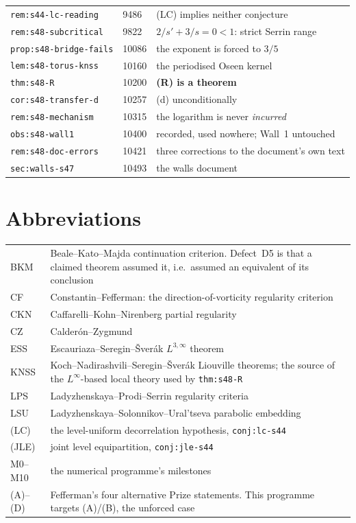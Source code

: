 {\begin{longtable}{@{}>{\raggedright\arraybackslash}p{} l >{\raggedright\arraybackslash}p{}@{}}
\texttt{rem:s44-lc-reading} & 9486 & (LC) implies neither conjecture \\
\texttt{rem:s48-subcritical} & 9822 & \(2/s'+3/s=0<1\): strict Serrin range \\
\texttt{prop:s48-bridge-fails} & 10086 & the exponent is forced to \(3/5\) \\
\texttt{lem:s48-torus-knss} & 10160 & the periodised Oseen kernel \\
\texttt{thm:s48-R} & 10200 & \textbf{(R) is a theorem} \\
\texttt{cor:s48-transfer-d} & 10257 & (d) unconditionally \\
\texttt{rem:s48-mechanism} & 10315 & the logarithm is never \emph{incurred} \\
\texttt{obs:s48-wall1} & 10400 & recorded, used nowhere; Wall~1 untouched \\
\texttt{rem:s48-doc-errors} & 10421 & three corrections to the document's own
  text \\
\texttt{sec:walls-s47} & 10493 & the walls document \\
\end{longtable}}

\section{Abbreviations}
\label{sec:a3-abbrev}

\begin{center}
\small
\begin{tabular}{@{}l p{}@{}}
\toprule
BKM & Beale--Kato--Majda continuation criterion. Defect~D5 is that a claimed
  theorem assumed it, i.e.\ assumed an equivalent of its conclusion \\
CF & Constantin--Fefferman: the direction-of-vorticity regularity criterion \\
CKN & Caffarelli--Kohn--Nirenberg partial regularity \\
CZ & Calder\'on--Zygmund \\
ESS & Escauriaza--Seregin--\v{S}ver\'ak \(L^{3,\infty}\) theorem \\
KNSS & Koch--Nadirashvili--Seregin--\v{S}ver\'ak Liouville theorems; the
  source of the \(L^\infty\)-based local theory used by \texttt{thm:s48-R} \\
LPS & Ladyzhenskaya--Prodi--Serrin regularity criteria \\
LSU & Ladyzhenskaya--Solonnikov--Ural'tseva parabolic embedding \\
(LC) & the level-uniform decorrelation hypothesis, \texttt{conj:lc-s44} \\
(JLE) & joint level equipartition, \texttt{conj:jle-s44} \\
M0--M10 & the numerical programme's milestones \\
(A)--(D) & Fefferman's four alternative Prize statements. This programme
  targets (A)/(B), the unforced case \\
\bottomrule
\end{tabular}
\end{center}
